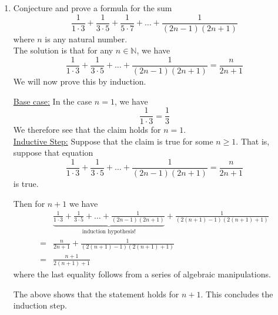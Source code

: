 \documentclass[12pt, reqno]{article}
\numberwithin{equation}{section}
\theoremstyle{definition}
\theoremstyle{remark}
\newcommand{\NN}{\mathbb{N}}
\begin{document}
\begin{enumerate}[leftmargin=*]
	\item Conjecture and prove a formula for the sum
	      \[
		      \frac{1}{1\cdot 3} +\frac{1}{3\cdot 5} + \frac{1}{5\cdot 7} + \dots + \frac{1}{(2n-1)(2n+1)}
	      \]
	      where $n$ is any natural number.\\

	      The solution is that for any $n\in\NN$, we have
	      \[
		      \frac{1}{1\cdot 3} +\frac{1}{3\cdot 5} + \dots + \frac{1}{(2n-1)(2n+1)} = \frac{n}{2n+1}
	      \]
	      We will now prove this by induction.

	      \noindent\underline{Base case:} In the case $n=1$, we have
	      \[
		      \frac{1}{1\cdot 3} = \frac{1}{3}
	      \]
	      We therefore see that the claim holds for $n=1$.\\
	      \underline{Inductive Step:} Suppose that the claim is true for some $n\geq 1$. That is, suppose that equation
	      \[
		      \frac{1}{1\cdot 3} +\frac{1}{3\cdot 5} + \dots + \frac{1}{(2n-1)(2n+1)} = \frac{n}{2n+1}
	      \]
	      is true.

	      Then for $n+1$ we have
	      \begin{align*}
		        & \underbrace{\frac{1}{1\cdot 3} +\frac{1}{3\cdot 5} + \dots + \frac{1}{(2n-1)(2n+1)}}_{\text{induction hypothesis!}} + \frac{1}{(2(n+1)-1)(2(n+1)+1)} \\
		      = & \frac{n}{2n+1} + \frac{1}{(2(n+1)-1)(2(n+1)+1)}                                                                                                      \\
		      = & \frac{n+1}{2(n+1)+1}
	      \end{align*}
	      where the last equality follows from a series of algebraic manipulations.
	      \iffalse
		      \begin{align*}
			      \frac{n}{2n+1} + \frac{1}{(2(n+1)-1)(2(n+1)+1)}
			      = & \frac{n}{2n+1} + \frac{1}{(2n+1)(2(n+1)+1)} \\
			      = & \frac{n(2n+3)+1}{(2n+1)(2(n+1)+1)}          \\
			      = & \frac{2n^2+3n+1}{(2n+1)(2(n+1)+1)}          \\
			      = & \frac{2n^2+3n+1}{(2n+1)(2(n+1)+1)}          \\
			      = & \frac{(2n+1)(n+1)}{(2n+1)(2(n+1)+1)}        \\
			      = & \frac{n+1}{2(n+1)+1}                        \\
		      \end{align*}
	      \fi
	      The above shows that the statement holds for $n+1$. This concludes the induction step.


\end{enumerate}
\end{document}

